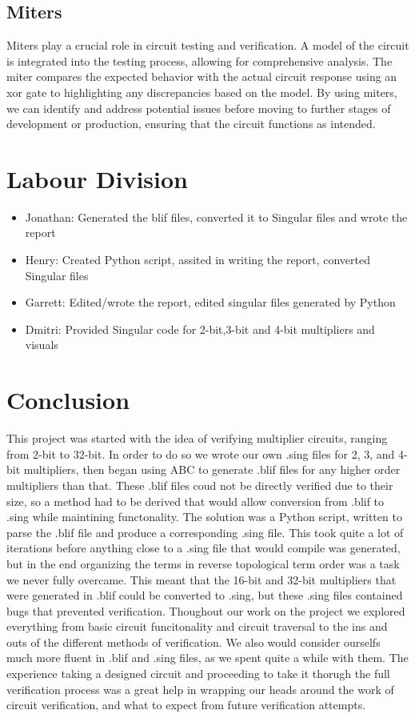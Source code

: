 \documentclass[conference]{IEEEtran}
\begin{document}
\subsection{Miters}
Miters play a crucial role in circuit testing and verification. A model of the circuit is integrated into 
the testing process, allowing for comprehensive analysis. The miter compares the expected behavior with 
the actual circuit response using an xor gate to highlighting any discrepancies based on the model. 
By using miters, we can identify and address potential issues before moving to further stages of development 
or production, ensuring that the circuit functions as intended.  

\section{Labour Division}
\begin{itemize}
    \item Jonathan: Generated the blif files, converted it to Singular files and wrote the report
    \item Henry: Created Python script, assited in writing the report, converted Singular files
    \item Garrett: Edited/wrote the report, edited singular files generated by Python
    \item Dmitri: Provided Singular code for 2-bit,3-bit and 4-bit multipliers and visuals
\end{itemize}

\section{Conclusion}
This project was started with the idea of verifying multiplier circuits, ranging from 2-bit to
 32-bit. In order to do so we wrote our own .sing files for 2, 3, and 4-bit multipliers, then began using ABC to generate .blif files for any higher order multipliers than that. These .blif files coud not be directly verified due to their size, so a method had to be derived that would allow conversion from .blif to .sing while maintining functonality. The solution was a Python script, written to parse the .blif file and produce a corresponding .sing file. This took quite a lot of iterations before anything close to a .sing file that would compile was generated, but in the end organizing the terms in reverse topological term order was a task we never fully overcame. This meant that the 16-bit and 32-bit multipliers that were generated in .blif could be converted to .sing, but these .sing files contained bugs that prevented verification. Thoughout our work on the project we explored everything from basic circuit funcitonality and circuit traversal to the ins and outs of the different methods of verification. We also would consider ourselfs much more fluent in .blif and .sing files, as we spent quite a while with them. The experience taking a designed circuit and proceeding to take it thorugh the full verification process was a great help in wrapping our heads around the work of circuit verification, and what to expect from future verification attempts.
 
\end{document}
